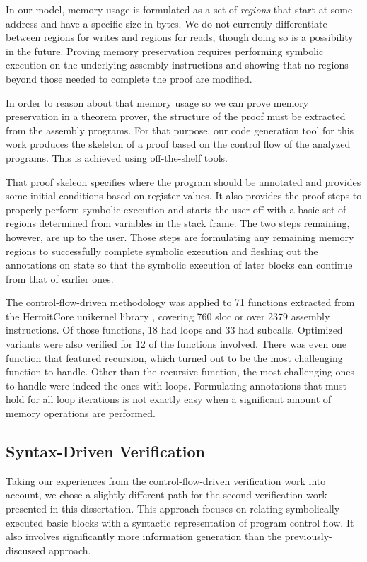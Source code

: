 In our model, memory usage is formulated as a set of \emph{regions}
that start at some address and have a specific size in bytes.
We do not currently differentiate between regions for writes and regions for reads,
though doing so is a possibility in the future.
Proving memory preservation requires performing symbolic execution
on the underlying assembly instructions
and showing that no regions beyond those needed to complete the proof are modified.

In order to reason about that memory usage
so we can prove memory preservation in a theorem prover,
the structure of the proof must be extracted from the assembly programs.
For that purpose,
our code generation tool for this work produces the skeleton of a proof
based on the control flow of the analyzed programs.
This is achieved using off-the-shelf tools.

That proof skeleon specifies where the program should be annotated
and provides some initial conditions based on register values.
It also provides the proof steps to properly perform symbolic execution
and starts the user off with a basic set of regions determined from variables in the stack frame.
The two steps remaining, however, are up to the user.
Those steps are formulating any remaining memory regions to successfully complete symbolic execution
and fleshing out the annotations on state so that the symbolic execution of later blocks
can continue from that of earlier ones.

The control-flow-driven methodology was applied to \num{71} functions
extracted from the HermitCore  \autocite{lankes2016hermitcore}
unikernel library \autocite{madhavapeddy2014unikernels},
covering \num{760} \ac{sloc} or over \num{2379} assembly instructions.
Of those functions, 18 had loops and 33 had subcalls.
Optimized variants were also verified for 12 of the functions involved.
There was even one function that featured recursion,
which turned out to be the most challenging function to handle.
Other than the recursive function, the most challenging ones to handle
were indeed the ones with loops. Formulating annotations that must hold for all loop iterations
is not exactly easy when a significant amount of memory operations are performed.

\subsection{Syntax-Driven Verification}
Taking our experiences from the control-flow-driven verification work into account,
we chose a slightly different path for the second verification work
presented in this dissertation.
This approach focuses on relating symbolically-executed basic blocks
with a syntactic representation of program control flow.
It also involves significantly more information generation
than the previously-discussed approach.

